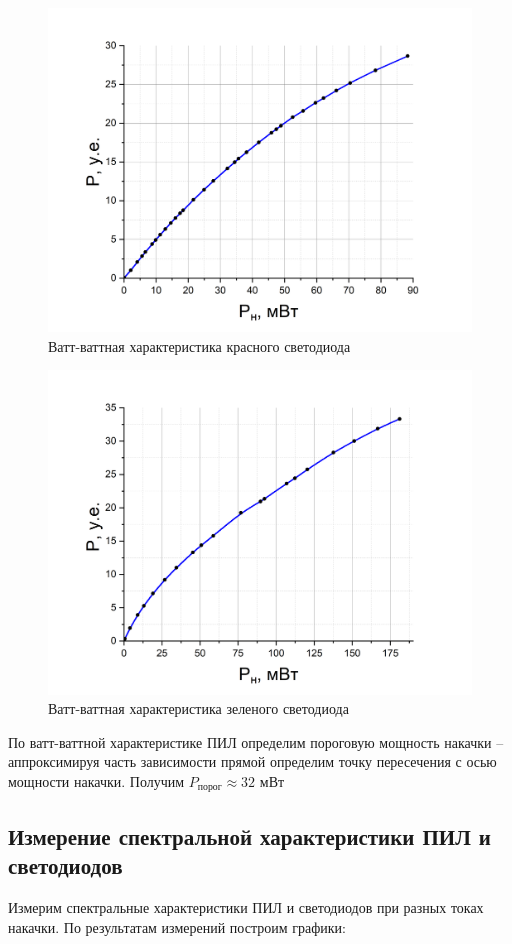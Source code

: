 \documentclass[a4paper,12pt]{article}
\begin{document}
\begin{figure}[h!]
	\centering
	\includegraphics[width = 0.8\linewidth]{red_vatt}
	\caption{Ватт-ваттная характеристика красного светодиода}
\end{figure}

\newpage


\begin{figure}[h!]
	\centering
	\includegraphics[width = 0.7\linewidth]{green_vatt}
	\caption{Ватт-ваттная характеристика зеленого светодиода}
\end{figure}

По ватт-ваттной характеристике ПИЛ определим пороговую мощность накачки -- аппроксимируя часть зависимости прямой определим точку пересечения с осью мощности накачки. Получим $P_{\text{порог}} \approx 32$ мВт

\subsection{Измерение спектральной характеристики ПИЛ и светодиодов}

Измерим спектральные характеристики ПИЛ и светодиодов при разных токах накачки. По результатам измерений построим графики:
\end{document}
